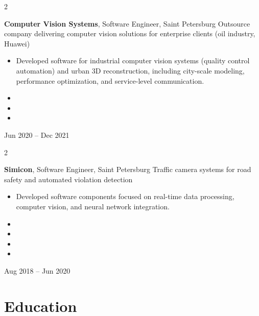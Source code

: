 \documentclass[10pt, letterpaper]{article}
\newenvironment{highlights}{
    \begin{itemize}[
        topsep=0.10 cm,
        parsep=0.10 cm,
        partopsep=0pt,
        itemsep=0pt,
        leftmargin=0.4 cm + 10pt
    ]
}{
    \end{itemize}
}
\newenvironment{twocolentry}[2][]{
    \onecolentry
    \def\secondColumn{#2}
    \setcolumnwidth{\fill, 4.5 cm}
    \begin{paracol}{2}
}{
    \switchcolumn \raggedleft \secondColumn
    \end{paracol}
    \endonecolentry
}
\begin{document}
        \begin{twocolentry}{
            Jun 2020 -- Dec 2021
        }
            \textbf{Computer Vision Systems}, Software Engineer, Saint Petersburg\newline
            {\small Outsource company delivering computer vision solutions for enterprise clients (oil industry, Huawei)}
            \begin{highlights}
                \item Developed software for industrial computer vision systems (quality control automation) and urban 3D reconstruction, including city-scale modeling, performance optimization, and service-level communication.
                \item \CVSAchOne
                \item \CVSAchTwo
                \item \CVSAchThree
            \end{highlights}
        \end{twocolentry}

        \vspace{0.2 cm}

        \begin{twocolentry}{
            Aug 2018 -- Jun 2020
        }
            \textbf{Simicon}, Software Engineer, Saint Petersburg\newline
            {\small Traffic camera systems for road safety and automated violation detection}
            \begin{highlights}
                \item Developed software components focused on real-time data processing, computer vision, and neural network integration.
                \item \SimiconAchOne
                \item \SimiconAchTwo
                \item \SimiconAchThree
                \item \SimiconAchFour
            \end{highlights}
        \end{twocolentry}

    \section{Education}
\end{document}
